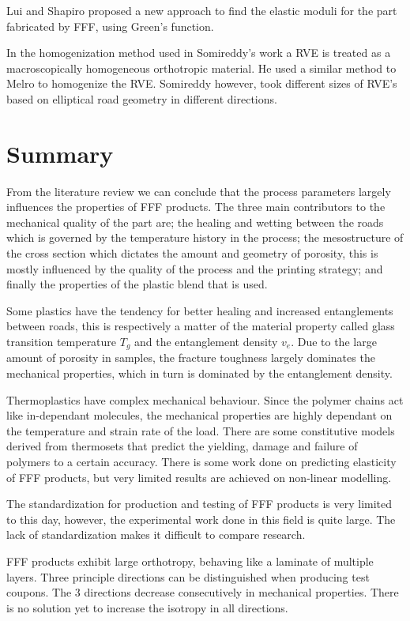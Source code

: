 Lui and Shapiro \cite{Liu2016HomogenizationStructures} proposed a new approach to find the elastic moduli for the part fabricated by FFF, using Green's function. 

In the homogenization method used in Somireddy's work \cite{Somireddy2018DevelopmentFDM} a RVE is treated as a macroscopically homogeneous orthotropic material. He used a similar method to Melro to homogenize the RVE. Somireddy however, took different sizes of RVE's based on  elliptical road geometry in different directions.

\section{Summary}
From the literature review we can conclude that the process parameters largely influences the properties of FFF products. The three main contributors to the mechanical quality of the part are; the healing and wetting between the roads which is governed by the temperature history in the process; the mesostructure of the cross section which dictates the amount and geometry of porosity, this is mostly influenced by the quality of the process and the printing strategy; and finally the properties of the plastic blend that is used. 

Some plastics have the tendency for better healing and increased entanglements between roads, this is respectively a matter of the material property called glass transition temperature $T_g$ and the entanglement density $v_e$. Due to the large amount of porosity in samples, the fracture toughness largely dominates the mechanical properties, which in turn is dominated by the entanglement density.

Thermoplastics have complex mechanical behaviour. Since the polymer chains act like in-dependant molecules, the mechanical properties are highly dependant on the temperature and strain rate of the load. There are some constitutive models derived from thermosets that predict the yielding, damage and failure of polymers to a certain accuracy. There is some work done on predicting elasticity of FFF products, but very limited results are achieved on non-linear modelling. 

The standardization for production and testing of FFF products is very limited to this day, however, the experimental work done in this field is quite large. The lack of standardization makes it difficult to compare research. 

FFF products exhibit large orthotropy, behaving like a laminate of multiple layers. Three principle directions can be distinguished when producing test coupons. The 3 directions decrease consecutively in mechanical properties. There is no solution yet to increase the isotropy in all directions. 


